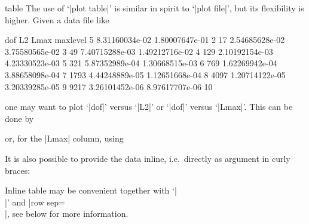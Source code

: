 {\begin{addplotoperation}[]{table}{}
\label{pgfplots:addplot:table}
The use of `|plot table|' is similar in spirit to `|plot file|', but its flexibility is higher. Given a data file like
\begin{codeexample}
dof     L2              Lmax            maxlevel
5       8.31160034e-02  1.80007647e-01  2
17      2.54685628e-02  3.75580565e-02  3
49      7.40715288e-03  1.49212716e-02  4
129     2.10192154e-03  4.23330523e-03  5
321     5.87352989e-04  1.30668515e-03  6
769     1.62269942e-04  3.88658098e-04  7
1793    4.44248889e-05  1.12651668e-04  8
4097    1.20714122e-05  3.20339285e-05  9
9217    3.26101452e-06  8.97617707e-06  10
\end{codeexample}
one may want to plot `|dof|' versus `|L2|' or `|dof|' versus `|Lmax|'. This can be done by
\begin{codeexample}
\end{codeexample}
or, for the |Lmax| column, using
\begin{codeexample}
\end{codeexample}
It is also possible to provide the data inline, i.e.\ directly as argument in curly braces:
\begin{codeexample}
\end{codeexample}
\noindent Inline table may be convenient together with `|\\|' and |row sep=\\|, see below for more information.


\end{addplotoperation}}
